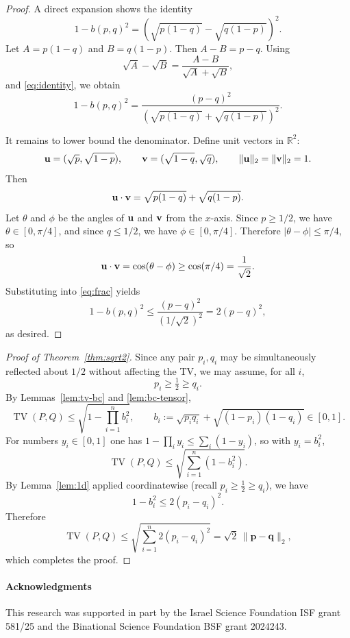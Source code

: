 \documentclass[11pt]{amsart}
\numberwithin{equation}{section}
\theoremstyle{definition}
\newcommand{\TV}{\operatorname{TV}}
\newcommand{\vct}[1]{\mathbf{#1}}
\renewcommand{\vec}[1]{\textup{{\bf #1}}}
\newcommand{\pvec}{\vct{p}}
\newcommand{\qvec}{\vct{q}}
\begin{document}
\begin{proof}
A direct expansion shows the identity
\begin{equation}
\label{eq:identity}
1-b(p,q)^2=\left(\sqrt{p(1-q)}-\sqrt{q(1-p)}\right)^2.
\end{equation}
Let $A=p(1-q)$ and $B=q(1-p)$. Then $A-B=p-q$. Using
\[
\sqrt{A}-\sqrt{B}=\frac{A-B}{\sqrt{A}+\sqrt{B}},
\]
and \eqref{eq:identity}, we obtain
\begin{equation}
\label{eq:frac}
1-b(p,q)^2
=\frac{(p-q)^2}{\left(\sqrt{p(1-q)}+\sqrt{q(1-p)}\right)^2}.
\end{equation}

It remains to lower bound the denominator.
Define unit vectors in $\mathbb{R}^2$:
\[
\vec u=(\sqrt{p},\sqrt{1-p}),\qquad \vec v=(\sqrt{1-q},\sqrt{q}),
\qquad \|\vec u\|_2=\|\vec v\|_2=1.
\]
Then
\[
\vec u\cdot \vec v=\sqrt{p(1-q)}+\sqrt{q(1-p)}.
\]
Let $\theta$ and $\phi$ be the angles of $\vec u$ and $\vec v$ from the $x$-axis. Since $p\ge 1/2$,
we have $\theta\in[0,\pi/4]$, and since $q\le 1/2$, we have $\phi\in[0,\pi/4]$.
Therefore $|\theta-\phi|\le \pi/4$, so
\[
\vec u\cdot \vec v=\cos(\theta-\phi)\ge \cos(\pi/4)=\frac{1}{\sqrt{2}}.
\]
Substituting into \eqref{eq:frac} yields
\[
1-b(p,q)^2\le \frac{(p-q)^2}{(1/\sqrt2)^2}=2(p-q)^2,
\]
as desired.
\end{proof}

\begin{proof}[Proof of Theorem~\ref{thm:sqrt2}]
Since any pair $p_i,q_i$ may be simultaneously reflected about $1/2$ without affecting the TV,
we may assume, for all $i$,
\[
p_i\ge \tfrac12\ge q_i.
\]
By Lemmas~\ref{lem:tv-bc} and \ref{lem:bc-tensor},
\[
\TV(P,Q)\le \sqrt{1-\prod_{i=1}^n b_i^2},
\qquad
b_i:=\sqrt{p_iq_i}+\sqrt{(1-p_i)(1-q_i)}\in[0,1].
\]
For numbers $y_i\in[0,1]$ one has $1-\prod_i y_i \le \sum_i (1-y_i)$, so with $y_i=b_i^2$,
\[
\TV(P,Q)\le \sqrt{\sum_{i=1}^n (1-b_i^2)}.
\]
By Lemma~\ref{lem:1d} applied coordinatewise (recall $p_i\ge \tfrac12\ge q_i$), we have
\[
1-b_i^2\le 2(p_i-q_i)^2.
\]
Therefore
\[
\TV(P,Q)\le \sqrt{\sum_{i=1}^n 2(p_i-q_i)^2}
=\sqrt{2}\,\|\pvec-\qvec\|_2,
\]
which completes the proof.
\end{proof}



\paragraph{{\bf Acknowledgments}}
This research was supported in part by 
the Israel Science Foundation ISF grant
581/25
and the Binational Science Foundation BSF grant
2024243.
\end{document}
